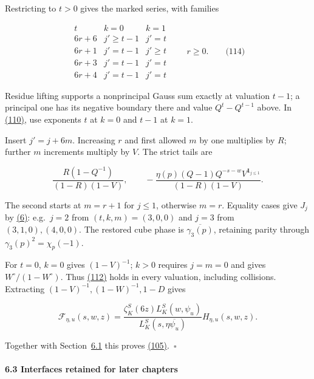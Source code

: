 Restricting to \(t>0\) gives the marked series, with families

\hypertarget{cf:eq:A.11}{}

\label{cf:eq:A.11}

\[
\begin{array}{c|cc}
 t&k=0&k=1\\\hline
 6r+6&j'\ge t-1&j'=t\\
 6r+1&j'=t-1&j'\ge t\\
 6r+3&j'=t-1&j'=t\\
 6r+4&j'=t-1&j'=t
\end{array}\qquad r\ge0.
\qquad\text{(114)}
\]

Residue lifting supports a nonprincipal Gauss sum exactly at valuation \(t-1\); a principal one has its negative boundary there and value \(Q^t-Q^{t-1}\) above. In \protect\hyperlink{cf:eq:A.7}{(110)}, use exponents \(t\) at \(k=0\) and \(t-1\) at \(k=1\).

Insert \(j'=j+6m\). Increasing \(r\) and first allowed \(m\) by one multiplies by \(R\); further \(m\) increments multiply by \(V\). The strict tails are

\[
\frac{R(1-Q^{-1})}{(1-R)(1-V)},\qquad
 -\frac{\eta(p)(Q-1)Q^{-s-w}V^{\mathbf1_{j\le1}}}{(1-R)(1-V)}.
\]

The second starts at \(m=r+1\) for \(j\le1\), otherwise \(m=r\). Equality cases give \(J_j\) by \protect\hyperlink{cf:eq:A.1}{(6)}: e.g.~\(j=2\) from \((t,k,m)=(3,0,0)\) and \(j=3\) from \((3,1,0),(4,0,0)\). The restored cube phase is \(\overline{\gamma_3(p)}\), retaining parity through \(\gamma_3(p)^2=\chi_p(-1)\).

For \(t=0\), \(k=0\) gives \((1-V)^{-1}\); \(k>0\) requires \(j=m=0\) and gives \(W^\circ/(1-W^\circ)\). Thus \protect\hyperlink{cf:eq:A.9}{(112)} holds in every valuation, including collisions. Extracting \((1-V)^{-1},(1-W)^{-1},1-D\) gives

\[
\mathcal F_{\eta,u}(s,w,z)=
 \frac{\zeta_K^S(6z)L_K^S(w,\psi_u)}{L_K^S(s,\eta\overline{\psi_u})}
 H_{\eta,u}(s,w,z).
\]

Together with Section~\protect\hyperlink{cf:sec:A.2}{6.1} this proves \protect\hyperlink{cf:eq:2.8}{(105)}.~\(\square\)

\hypertarget{cf:interfaces}{}

\label{cf:interfaces}

\hypertarget{interfaces-retained-for-later-chapters}{%
\paragraph{6.3 Interfaces retained for later chapters}\label{interfaces-retained-for-later-chapters}}

